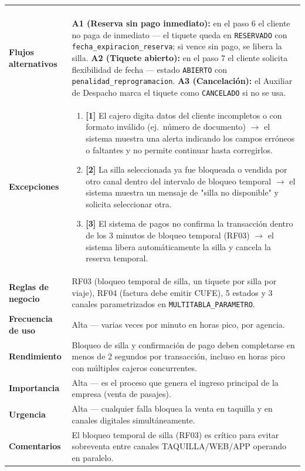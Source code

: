 \documentclass[11pt,a4paper]{article}
\begin{document}
{\begin{longtable}{L{3.2cm} L{11.3cm}}
\begin{enumerate}[nosep,leftmargin=*]
\end{enumerate} \\
\textbf{Flujos alternativos} &
\textbf{A1 (Reserva sin pago inmediato):} en el paso 6 el cliente no paga de inmediato --- el tiquete queda en \texttt{RESERVADO} con \texttt{fecha_expiracion_reserva}; si vence sin pago, se libera la silla.\newline
\textbf{A2 (Tiquete abierto):} en el paso 7 el cliente solicita flexibilidad de fecha --- estado \texttt{ABIERTO} con \texttt{penalidad_reprogramacion}.\newline
\textbf{A3 (Cancelación):} el Auxiliar de Despacho marca el tiquete como \texttt{CANCELADO} si no se usa. \\
\textbf{Excepciones} &
\begin{enumerate}[nosep,leftmargin=*]
  \item \textbf{[1]} El cajero digita datos del cliente incompletos o con formato inválido (ej.\ número de documento) $\rightarrow$ el sistema muestra una alerta indicando los campos erróneos o faltantes y no permite continuar hasta corregirlos.
  \item \textbf{[2]} La silla seleccionada ya fue bloqueada o vendida por otro canal dentro del intervalo de bloqueo temporal $\rightarrow$ el sistema muestra un mensaje de "silla no disponible" y solicita seleccionar otra.
  \item \textbf{[3]} El sistema de pagos no confirma la transacción dentro de los 3 minutos de bloqueo temporal (RF03) $\rightarrow$ el sistema libera automáticamente la silla y cancela la reserva temporal.
\end{enumerate} \\
\textbf{Reglas de negocio} & RF03 (bloqueo temporal de silla, un tiquete por silla por viaje), RF04 (factura debe emitir CUFE), 5 estados y 3 canales parametrizados en \texttt{MULTITABLA_PARAMETRO}. \\
\textbf{Frecuencia de uso} & Alta --- varias veces por minuto en horas pico, por agencia. \\
\textbf{Rendimiento} & Bloqueo de silla y confirmación de pago deben completarse en menos de 2 segundos por transacción, incluso en horas pico con múltiples cajeros concurrentes. \\
\textbf{Importancia} & Alta --- es el proceso que genera el ingreso principal de la empresa (venta de pasajes). \\
\textbf{Urgencia} & Alta --- cualquier falla bloquea la venta en taquilla y en canales digitales simultáneamente. \\
\textbf{Comentarios} & El bloqueo temporal de silla (RF03) es crítico para evitar sobreventa entre canales TAQUILLA/WEB/APP operando en paralelo. \\
\bottomrule
\end{longtable}
}
\end{document}
